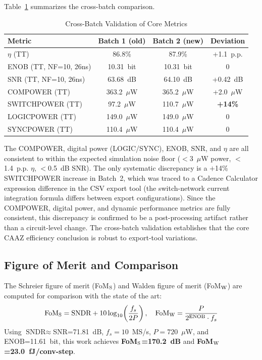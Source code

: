 \documentclass[journal]{IEEEtran}
\begin{document}
Table~\ref{tab:crossbatch} summarizes the cross-batch comparison.

\begin{table}[htbp]
\centering
\caption{Cross-Batch Validation of Core Metrics}
\label{tab:crossbatch}
\small
\begin{tabular}{lccc}
\toprule
\textbf{Metric} & \textbf{Batch 1 (old)} & \textbf{Batch 2 (new)} & \textbf{Deviation} \\
\midrule
$\eta$ (TT) & 86.8\% & 87.9\% & +1.1~p.p. \\
ENOB (TT, NF=10, 26ns) & 10.31~bit & 10.31~bit & 0 \\
SNR (TT, NF=10, 26ns) & 63.68~dB & 64.10~dB & +0.42~dB \\
COMPOWER (TT) & 363.2~$\mu$W & 365.2~$\mu$W & +2.0~$\mu$W \\
SWITCHPOWER (TT) & 97.2~$\mu$W & 110.7~$\mu$W & \textbf{+14\%} \\
LOGICPOWER (TT) & 149.0~$\mu$W & 149.0~$\mu$W & 0 \\
SYNCPOWER (TT) & 110.4~$\mu$W & 110.4~$\mu$W & 0 \\
\bottomrule
\end{tabular}
\end{table}

The COMPOWER, digital power (LOGIC/SYNC), ENOB, SNR, and $\eta$ are all consistent to within the expected simulation noise floor ($<$3~$\mu$W power, $<$1.4~p.p. $\eta$, $<$0.5~dB SNR). The only systematic discrepancy is a $+$14\% SWITCHPOWER increase in Batch~2, which was traced to a Cadence Calculator expression difference in the CSV export tool (the switch-network current integration formula differs between export configurations). Since the COMPOWER, digital power, and dynamic performance metrics are fully consistent, this discrepancy is confirmed to be a post-processing artifact rather than a circuit-level change. The cross-batch validation establishes that the core CAAZ efficiency conclusion is robust to export-tool variations.

\subsection{Figure of Merit and Comparison}

The Schreier figure of merit (FoM$_{\rm S}$) and Walden figure of merit (FoM$_{\rm W}$) are computed for comparison with the state of the art:
\begin{equation}
\text{FoM}_{\rm S} = \text{SNDR} + 10\log_{10}\!\left(\frac{f_s}{2P}\right),\quad
\text{FoM}_{\rm W} = \frac{P}{2^{\rm ENOB}\cdot f_s}
\label{eq:fom}
\end{equation}
Using $\text{SNDR}\approx$SNR=71.81~dB, $f_s=10$~MS/s, $P=720$~$\mu$W, and ENOB=11.61~bit, this work achieves \textbf{FoM$_{\rm S}$=170.2~dB} and \textbf{FoM$_{\rm W}$=23.0~fJ/conv-step}.
\end{document}
